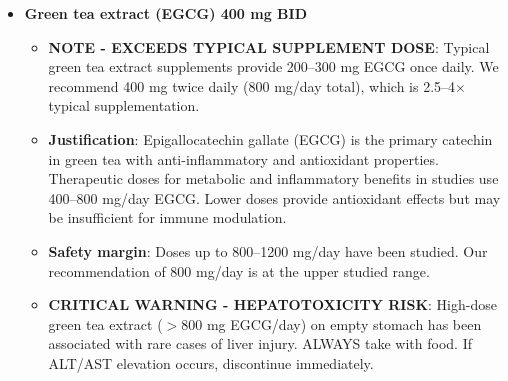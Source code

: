 \begin{enumerate}
\begin{itemize}
\begin{itemize}
            \item \textbf{Justification}: Resveratrol activates sirtuins (SIRT1) and inhibits NF-$\kappa$B, providing anti-inflammatory and potential mitochondrial benefits. Therapeutic doses for metabolic and inflammatory conditions in research studies use 500--1000 mg/day or higher. Lower doses may not achieve sufficient tissue concentrations for anti-inflammatory effects.
            \item \textbf{Bioavailability note}: Resveratrol has poor bioavailability ($<$1\%). This necessitates higher oral doses to achieve therapeutic levels. Micronized or liposomal formulations may improve absorption.
            \item \textbf{Safety margin}: Clinical trials have used up to 2000--5000 mg/day without serious adverse effects. Our recommendation of 1000 mg/day is moderate.
            \item \textbf{Side effects}: Generally well-tolerated. Occasional GI upset (nausea, diarrhea) at high doses. Take with food.
            \item \textbf{Drug interactions}: May potentiate anticoagulants. Theoretical interaction with immunosuppressants.
            \item \textbf{Monitoring}: None required.
        \end{itemize}
        \item \textbf{Green tea extract (EGCG) 400 mg BID}
        \begin{itemize}
            \item \textbf{NOTE - EXCEEDS TYPICAL SUPPLEMENT DOSE}: Typical green tea extract supplements provide 200--300 mg EGCG once daily. We recommend 400 mg twice daily (800 mg/day total), which is 2.5--4$\times$ typical supplementation.
            \item \textbf{Justification}: Epigallocatechin gallate (EGCG) is the primary catechin in green tea with anti-inflammatory and antioxidant properties. Therapeutic doses for metabolic and inflammatory benefits in studies use 400--800 mg/day EGCG. Lower doses provide antioxidant effects but may be insufficient for immune modulation.
            \item \textbf{Safety margin}: Doses up to 800--1200 mg/day have been studied. Our recommendation of 800 mg/day is at the upper studied range.
            \item \textbf{CRITICAL WARNING - HEPATOTOXICITY RISK}: High-dose green tea extract ($>$800 mg EGCG/day) on empty stomach has been associated with rare cases of liver injury. ALWAYS take with food. If ALT/AST elevation occurs, discontinue immediately.

\end{itemize}
\end{itemize}
\end{enumerate}
